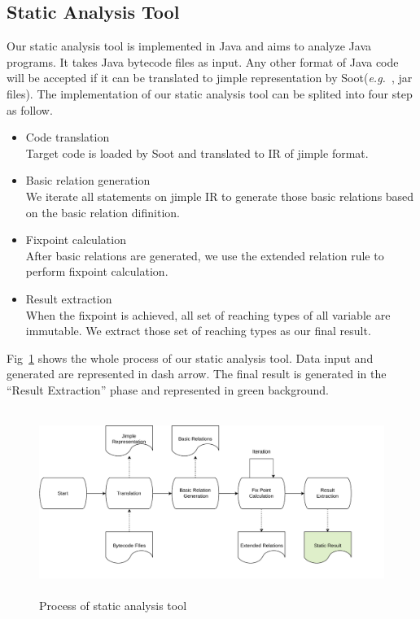 \documentclass{fac}
\newcommand\eg{\textit{e.g.\ }}
\begin{document}
\subsection{Static Analysis Tool}\label{subsec:static-analysis-tool}
Our static analysis tool is implemented in Java and aims to analyze Java programs. It takes Java bytecode files as input. Any other format of Java code will be accepted if it can be translated to jimple representation by Soot(\eg, jar files). The implementation of our static analysis tool can be splited into four step as follow.
\begin{itemize}
\item Code translation\\
Target code is loaded by Soot and translated to IR of jimple format.
\item Basic relation generation\\
We iterate all statements on jimple IR to generate those basic relations based on the basic relation difinition. 
\item Fixpoint calculation\\
After basic relations are generated, we use the extended relation rule to perform fixpoint calculation.
\item Result extraction\\
When the fixpoint is achieved, all set of reaching types of all variable are immutable. We extract those set of reaching types as our final result.
\end{itemize}
Fig~\ref{fig:static-process} shows the whole process of our static analysis tool. Data input and generated are represented in dash arrow. The final result is generated in the ``Result Extraction'' phase and represented in green background.

\begin{figure}
\centering
\includegraphics[width=16cm,height=6cm]{static-process.pdf}
\caption{Process of static analysis tool}
\label{fig:static-process}
\end{figure}
\end{document}
